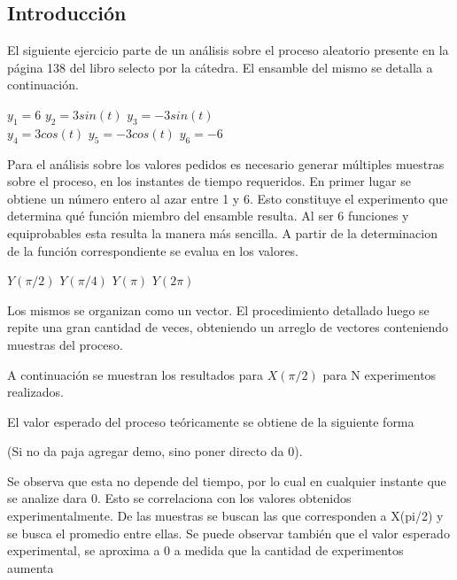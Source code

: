 



\subsection{Introducción}

El siguiente ejercicio parte de un análisis sobre el proceso aleatorio presente en la página 138 del libro selecto por la cátedra. El ensamble del mismo se detalla a continuación.

\begin{center}
    $y_{1} = 6$ $y_{2} = 3sin(t)$  $y_{3} = -3sin(t)$ \\
    $y_{4} = 3cos(t)$ $y_{5} = -3cos(t)$  $y_{6} = -6$
\end{center}

Para el análisis sobre los valores pedidos es necesario generar múltiples muestras sobre el proceso, en los instantes de tiempo requeridos. En primer lugar se obtiene un número entero al azar entre 1 y 6. Esto constituye el experimento que determina qué función miembro del ensamble resulta. Al ser 6 funciones y equiprobables esta resulta la manera más sencilla. A partir de la determinacion de la función correspondiente se evalua en los valores.

\begin{center}
    $Y(\pi/2)$ $Y(\pi/4)$ $Y(\pi)$ $Y(2\pi)$
\end{center}


Los mismos se organizan como un vector. El procedimiento detallado luego se repite una gran cantidad de veces, obteniendo un arreglo de vectores conteniendo muestras del proceso.

A continuación se muestran los resultados para $X(\pi/2)$ para N experimentos realizados.


El valor esperado del proceso teóricamente se obtiene de la siguiente forma


(Si no da paja agregar demo, sino poner directo da 0).

Se observa que esta no depende del tiempo, por lo cual en cualquier instante que se analize dara 0. Esto se correlaciona con los valores obtenidos experimentalmente. De las muestras se buscan las que corresponden a X(pi/2) y se busca el promedio entre ellas. Se puede observar también que el valor esperado experimental, se aproxima a 0 a medida que la cantidad de experimentos aumenta







